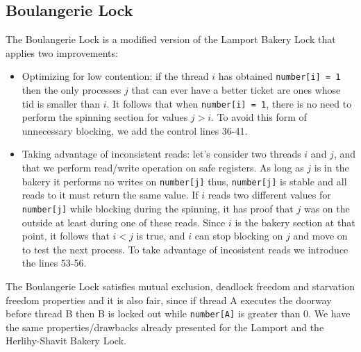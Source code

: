\subsection{Boulangerie Lock}
The Boulangerie Lock \cite{MOSES201846} is a modified version of the Lamport Bakery Lock that applies two improvements:
\begin{itemize}
	\item Optimizing for low contention: if the thread $i$ has obtained \texttt{number[i] = 1} then the only processes $j$ that can ever have a better ticket are ones whose tid is smaller than $i$. It follows that when \texttt{number[i] = 1}, there is no need to perform the spinning section for values $j > i$. To avoid this form of unnecessary blocking, we add the control lines 36-41.

	\item Taking advantage of inconsistent reads: let's consider two threads $i$ and $j$, and that we perform read/write operation on safe registers. As long as $j$ is in the bakery it performs no writes on \texttt{number[j]} thus, \texttt{number[j]} is stable and all reads to it must return the same value. If $i$ reads two different values for \texttt{number[j]} while blocking during the spinning, it has proof that $j$ was on the outside at least during one of these reads. Since $i$ is the bakery section at that point, it follows that $i < j$ is true, and $i$ can stop blocking on $j$ and move on to test the next process. To take advantage of incosistent reads we introduce the lines 53-56.
\end{itemize}

The Boulangerie Lock satisfies mutual exclusion, deadlock freedom and starvation freedom properties and it is also fair, since if thread A executes the doorway before thread B then B is locked out while \texttt{number[A]} is greater than 0. We have the same properties/drawbacks already presented for the Lamport and the Herlihy-Shavit Bakery Lock.

